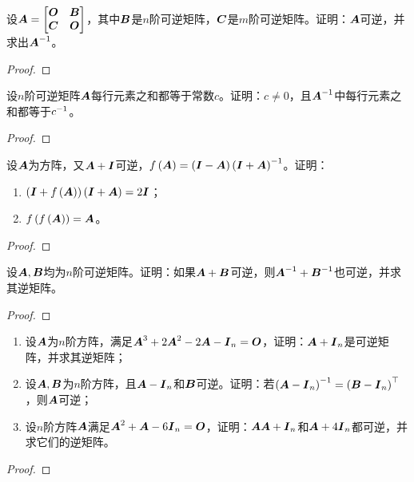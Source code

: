 \begin{problem}
设\(\boldsymbol{A}=\begin{bmatrix}\boldsymbol{O}&\boldsymbol{B}\\\boldsymbol{C}&\boldsymbol{O}\end{bmatrix}\)，其中\(\boldsymbol{B}\)是\(n\)阶可逆矩阵，\(\boldsymbol{C}\)是\(m\)阶可逆矩阵。证明：\(\boldsymbol{A}\)可逆，并求出\({\boldsymbol{A}}^{-1}\)。
\end{problem}
\begin{proof}

\end{proof}

\begin{problem}
设\(n\)阶可逆矩阵\(\boldsymbol{A}\)每行元素之和都等于常数\(c\)。证明：\(c\neq0\)，且\({\boldsymbol{A}}^{-1}\)中每行元素之和都等于\({c}^{-1}\)。
\end{problem}
\begin{proof}

\end{proof}

\begin{problem}
设\(\boldsymbol{A}\)为方阵，又\(\boldsymbol{A}+\boldsymbol{I}\)可逆，\(f\left( \boldsymbol{A} \right)=\left( \boldsymbol{I}-\boldsymbol{A} \right){\left( \boldsymbol{I}+\boldsymbol{A} \right)}^{-1}\)。证明：
\begin{enumerate}
    \item \(\left( \boldsymbol{I}+f\left( \boldsymbol{A} \right) \right)\left( \boldsymbol{I}+\boldsymbol{A} \right)=2\boldsymbol{I}\)；
    \item \(f\left( f\left( \boldsymbol{A} \right) \right)=\boldsymbol{A}\)。
\end{enumerate}
\end{problem}
\begin{proof}

\end{proof}

\begin{problem}
设\(\boldsymbol{A},\boldsymbol{B}\)均为\(n\)阶可逆矩阵。证明：如果\(\boldsymbol{A}+\boldsymbol{B}\)可逆，则\({\boldsymbol{A}}^{-1}+{\boldsymbol{B}}^{-1}\)也可逆，并求其逆矩阵。
\end{problem}
\begin{proof}

\end{proof}

\begin{problem}
\begin{enumerate}
    \item 设\(\boldsymbol{A}\)为\(n\)阶方阵，满足\(\boldsymbol{A}^3+2\boldsymbol{A}^2-2\boldsymbol{A}-\boldsymbol{I}_n=\boldsymbol{O}\)，证明：\(\boldsymbol{A}+\boldsymbol{I}_n\)是可逆矩阵，并求其逆矩阵；
    \item
          {
          设\(\boldsymbol{A},\boldsymbol{B}\)为\(n\)阶方阵，且\(\boldsymbol{A}-\boldsymbol{I}_n\)和\(\boldsymbol{B}\)可逆。证明：若\({\left( \boldsymbol{A}-\boldsymbol{I}_n \right)}^{-1}=\left( \boldsymbol{B}-\boldsymbol{I}_n \right)^\top\)，则\(\boldsymbol{A}\)可逆；
          }
    \item 设\(n\)阶方阵\(\boldsymbol{A}\)满足\(\boldsymbol{A}^2+\boldsymbol{A}-6\boldsymbol{I}_n=\boldsymbol{O}\)，证明：\(\boldsymbol{A}\boldsymbol{A}+\boldsymbol{I}_n\)和\(\boldsymbol{A}+4\boldsymbol{I}_n\)都可逆，并求它们的逆矩阵。
\end{enumerate}
\end{problem}
\begin{proof}

\end{proof}

